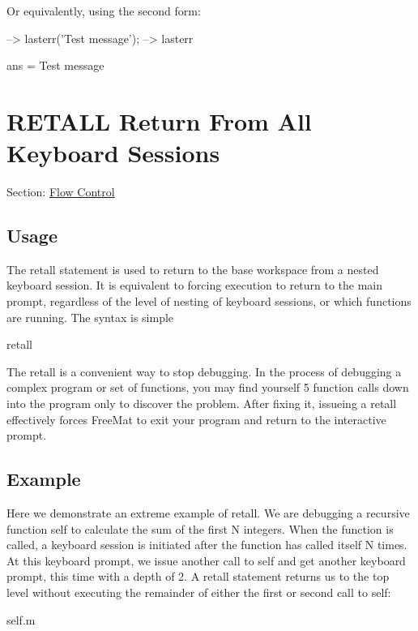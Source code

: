 Or equivalently, using the second form\-:


\begin{DoxyVerbInclude}
--> lasterr('Test message');
--> lasterr

ans = 
Test message
\end{DoxyVerbInclude}
 \hypertarget{flow_retall}{}\section{R\-E\-T\-A\-L\-L Return From All Keyboard Sessions}\label{flow_retall}
Section\-: \hyperlink{sec_flow}{Flow Control} \hypertarget{vtkwidgets_vtkxyplotwidget_Usage}{}\subsection{Usage}\label{vtkwidgets_vtkxyplotwidget_Usage}
The {\ttfamily retall} statement is used to return to the base workspace from a nested {\ttfamily keyboard} session. It is equivalent to forcing execution to return to the main prompt, regardless of the level of nesting of {\ttfamily keyboard} sessions, or which functions are running. The syntax is simple \begin{DoxyVerb}   retall
\end{DoxyVerb}
 The {\ttfamily retall} is a convenient way to stop debugging. In the process of debugging a complex program or set of functions, you may find yourself 5 function calls down into the program only to discover the problem. After fixing it, issueing a {\ttfamily retall} effectively forces Free\-Mat to exit your program and return to the interactive prompt. \hypertarget{variables_struct_Example}{}\subsection{Example}\label{variables_struct_Example}
Here we demonstrate an extreme example of {\ttfamily retall}. We are debugging a recursive function {\ttfamily self} to calculate the sum of the first N integers. When the function is called, a {\ttfamily keyboard} session is initiated after the function has called itself N times. At this {\ttfamily keyboard} prompt, we issue another call to {\ttfamily self} and get another {\ttfamily keyboard} prompt, this time with a depth of 2. A {\ttfamily retall} statement returns us to the top level without executing the remainder of either the first or second call to {\ttfamily self}\-:

\begin{DoxyVerb}     self.m
\end{DoxyVerb}



